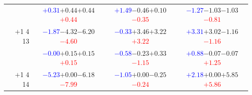 \documentclass[compress]{beamer}
\begin{document}
\begin{frame}
\begin{tabular}{r | c | c | c}
          & \textcolor{blue}{$+0.31$}\hspace{0.1 cm}$+0.44$\hspace{0.1 cm}$+0.44$\hspace{0.1 cm}\textcolor{red}{$+0.44$} & \textcolor{blue}{$+1.49$}\hspace{0.1 cm}$-0.46$\hspace{0.1 cm}$+0.10$\hspace{0.1 cm}\textcolor{red}{$-0.35$} & \textcolor{blue}{$-1.27$}\hspace{0.1 cm}$-1.03$\hspace{0.1 cm}$-1.03$\hspace{0.1 cm}\textcolor{red}{$-0.81$} \\
$+$1 4 13 & \textcolor{blue}{$-1.87$}\hspace{0.1 cm}$-4.32$\hspace{0.1 cm}$-6.20$\hspace{0.1 cm}\textcolor{red}{$-4.60$} & \textcolor{blue}{$-0.33$}\hspace{0.1 cm}$+3.46$\hspace{0.1 cm}$+3.22$\hspace{0.1 cm}\textcolor{red}{$+3.22$} & \textcolor{blue}{$+3.31$}\hspace{0.1 cm}$+3.02$\hspace{0.1 cm}$-1.16$\hspace{0.1 cm}\textcolor{red}{$-1.16$} \\
          & \textcolor{blue}{$-0.00$}\hspace{0.1 cm}$+0.15$\hspace{0.1 cm}$+0.15$\hspace{0.1 cm}\textcolor{red}{$+0.15$} & \textcolor{blue}{$-0.58$}\hspace{0.1 cm}$-0.23$\hspace{0.1 cm}$+0.33$\hspace{0.1 cm}\textcolor{red}{$-1.15$} & \textcolor{blue}{$+0.88$}\hspace{0.1 cm}$-0.07$\hspace{0.1 cm}$-0.07$\hspace{0.1 cm}\textcolor{red}{$+1.25$} \\
$+$1 4 14 & \textcolor{blue}{$-5.23$}\hspace{0.1 cm}$+0.00$\hspace{0.1 cm}$-6.18$\hspace{0.1 cm}\textcolor{red}{$-7.99$} & \textcolor{blue}{$-1.05$}\hspace{0.1 cm}$+0.00$\hspace{0.1 cm}$-0.25$\hspace{0.1 cm}\textcolor{red}{$-0.24$} & \textcolor{blue}{$+2.18$}\hspace{0.1 cm}$+0.00$\hspace{0.1 cm}$+5.85$\hspace{0.1 cm}\textcolor{red}{$+5.86$} \\

\end{tabular}
\end{frame}
\end{document}
